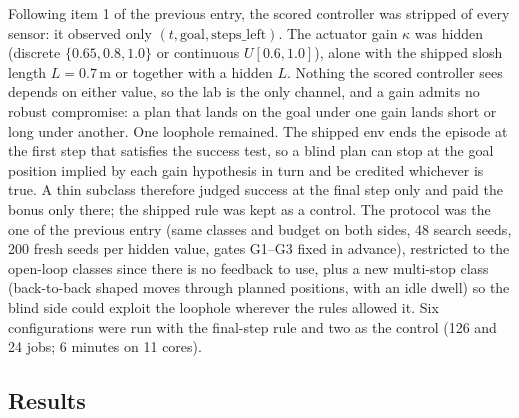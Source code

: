 \documentclass[11pt,a4paper]{article}
\begin{document}
Following item 1 of the previous entry, the scored controller was stripped of
every sensor: it observed only $(t, \text{goal}, \text{steps\_left})$. The
actuator gain $\kappa$ was hidden (discrete $\{0.65, 0.8, 1.0\}$ or continuous
$U[0.6,1.0]$), alone with the shipped slosh length $L=0.7$\,m or together
with a hidden $L$. Nothing the scored controller sees depends on either
value, so the lab is the only channel, and a gain admits no robust
compromise: a plan that lands on the goal under one gain lands short or long
under another. One loophole remained. The shipped env ends the episode at the
first step that satisfies the success test, so a blind plan can stop at the
goal position implied by each gain hypothesis in turn and be credited whichever
is true. A thin subclass therefore judged success at the final step only and
paid the bonus only there; the shipped rule was kept as a control. The
protocol was the one of the previous entry (same classes and budget on both
sides, 48 search seeds, 200 fresh seeds per hidden value, gates G1--G3 fixed
in advance), restricted to the open-loop classes since there is no feedback
to use, plus a new multi-stop class (back-to-back shaped moves through
planned positions, with an idle dwell) so the blind side could exploit the
loophole wherever the rules allowed it. Six configurations were run with the
final-step rule and two as the control (126 and 24 jobs; 6 minutes on 11
cores).

\subsection*{Results}

\begin{center}\small
{}
\end{center}
\end{document}
